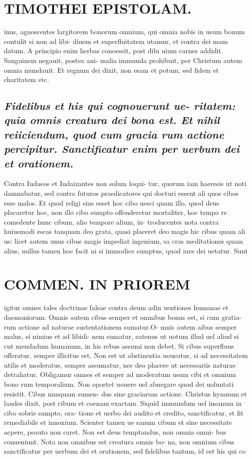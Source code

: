 \documentclass{article}
\begin{document}
\begin{pages}
\section*{TIMOTHEI EPISTOLAM. }
\marginpar{[ p.99 ]}\pstart inus, agnoscentes largitorem bonorum omnium, qui omnia nobis in usum bonum contulit si non ad libi- dinem et superfluitatem utamur, et contra dei mam datum. A principio enim herbas conoessit, post dilu uium carnes addidit. Sanguinem negauit, postea ani- malia immunda prohibuit, per Christum autem omnia mundauit. Et regnum dei dixit, non esam et potum, sed fidem et charitatem etc.  \pend
{}
{}
\subsection*{\textit{Fidelibus et his qui cognouerunt ue- ritatem: quia omnis creatura dei bona est. Et nihil reiiciendum, quod cum gracia rum actione percipitur. Sanctificatur enim per uerbum dei et orationem. }}\pstart Contra Iudaeos et Iudaizantes non solum loqui- tur, quorum iam haeresis ut noti damnabatur, sed contra futuros praedicatores qui docturi essent ali quos cibos esse malos. Et quod religi sius esset hoc cibo uesci quam illo, quod deus placaretur hoc, non illo cibo sumpto offenderetur mortaliter, hoc tempo re comedente hunc cibum, alio tempore alium, in- troducentes uota contra huiusmodi escas tanquam deo grata, quasi placeret deo magis hic cibus quam ali us: licet autem unus cibus magis impediat ingenium, sa cras meditationes quam alius, nullus tamen hoc facit ni si immodice sumptus, quod iure dei uetatur. Sunt  \pend
\section*{COMMEN. IN PRIOREM }
\marginpar{[ p.100 ]}\pstart igitur omnes tales doctrinae falsae contra deum adin uentiones humanae et daemoniorum. Omnis autem cibus semper et omnibus bonus est, si cum gratia- rum actione ad naturae sustentationem sumatur.O- mnis autem aibus semper malus, si nimius et ad libidi- nem sumatur, eatenus ut uotum illud uel aliud si cut mendadum humanum, in his rebus assumi non debet. Si cibus superfluus offeratur, semper illicitus est. Non est ut abstinentia uoueatur, si ad necessitatem utilis et moderatus, semper assumatur, nec deo placere ut necessariis naturae detrahatur. Obligamur omnes et semper ad moderatum usum cibi et omnium bono rum temporalium. Non oportet uouere uel abnegare quod dei uoluntati resistit. Cibus nunquam sumen- dus sine graciarum actione. Christus hymnum et laudes dixit, post cibum et coenam exactam. Siquid immundum uel insanum in cibo sobrie sumpto, ora- tione et uerbo dei audito et credito, sanctificatur, et fit remediabile et innoxium. Scienter tamen ue sanum cibum et sine necessitate acpere, peauto non caret. Non est deus temptandus, non omnia omni- bus conueniunt.  \pend\pstart Nota non omnibus est creatura omnis bo- na, non omnium cibus sanctificatur per uerbum dei et orationem, sed fidelibus tantum, id est his qui co  \pend

\end{pages}
\end{document}
